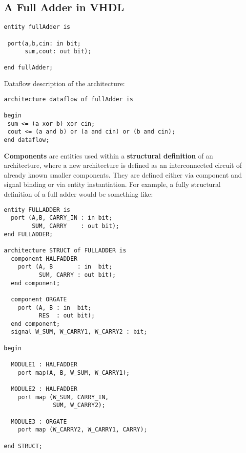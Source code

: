 \documentclass{report}
\newcommand{\tbf}{\textbf}
\newcommand*{\newpar}{\par\vspace{\baselineskip}\noindent} %
\begin{document}
\subsection{A Full Adder in VHDL}
\begin{verbatim}
entity fullAdder is

 port(a,b,cin: in bit;
      sum,cout: out bit);

end fullAdder;
\end{verbatim}
Dataflow description of the architecture:
\begin{verbatim}
architecture dataflow of fullAdder is

begin
 sum <= (a xor b) xor cin;
 cout <= (a and b) or (a and cin) or (b and cin);
end dataflow;
\end{verbatim}
\newpar
\tbf{Components} are entities used within a \tbf{structural definition} of an architecture, where a new architecture is defined as an interconnected circuit of already known smaller components. They are defined either via component and signal binding or via entity instantiation. For example, a fully structural definition of a full adder would be something like:
\begin{verbatim}
entity FULLADDER is
  port (A,B, CARRY_IN : in bit;
        SUM, CARRY    : out bit);
end FULLADDER;
 
architecture STRUCT of FULLADDER is
  component HALFADDER
    port (A, B       : in  bit;
          SUM, CARRY : out bit);
  end component;
 
  component ORGATE
    port (A, B : in  bit;
          RES  : out bit);
  end component;
  signal W_SUM, W_CARRY1, W_CARRY2 : bit;
 
begin
 
  MODULE1 : HALFADDER
    port map(A, B, W_SUM, W_CARRY1);
 
  MODULE2 : HALFADDER
    port map (W_SUM, CARRY_IN,
              SUM, W_CARRY2);
 
  MODULE3 : ORGATE
    port map (W_CARRY2, W_CARRY1, CARRY);
 
end STRUCT;
\end{verbatim}
\end{document}

